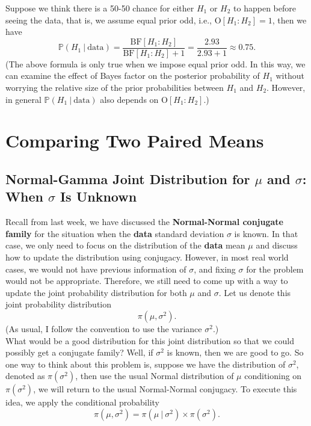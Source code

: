 \documentclass{article}
\begin{document}
Suppose we think there is a 50-50 chance for either $H_1$ or $H_2$ to happen before seeing the data, that is, we assume equal prior odd, i.e., $\text{O}[H_1:H_2] = 1$, then we have
$$ \mathbb{P}(H_1~|~\text{data}) = \frac{\text{BF}[H_1:H_2]}{\text{BF}[H_1:H_2] + 1} = \frac{2.93}{2.93+1}\approx 0.75. $$
(The above formula is only true when we impose equal prior odd. In this way, we can examine the effect of Bayes factor on the posterior probability of $H_1$ without worrying the relative size of the prior probabilities between $H_1$ and $H_2$. However, in general $\mathbb{P}(H_1~|~\text{data})$ also depends on $\text{O}[H_1:H_2]$.)


\section{Comparing Two Paired Means}

\subsection{Normal-Gamma Joint Distribution for $\mu$ and $\sigma$: When $\sigma$ Is Unknown}

Recall from last week, we have discussed the \textbf{Normal-Normal conjugate family} for the situation when the \textbf{data} standard deviation $\sigma$ is known. In that case, we only need to focus on the distribution of the \textbf{data} mean $\mu$ and discuss how to update the distribution using conjugacy. However, in most real world cases, we would not have previous information of $\sigma$, and fixing $\sigma$ for the problem would not be appropriate. Therefore, we still need to come up with a way to update the joint probability distribution for both $\mu$ and $\sigma$. Let us denote this joint probability distribution 
$$ \pi(\mu, \sigma^2). $$
(As usual, I follow the convention to use the variance $\sigma^2$.)\\

What would be a good distribution for this joint distribution so that we could possibly get a conjugate family? Well, if $\sigma^2$ is known, then we are good to go. So one way to think about this problem is, suppose we have the distribution of $\sigma^2$, denoted as $\pi(\sigma^2)$, then use the usual Normal distribution of $\mu$ conditioning on $\pi(\sigma^2)$, we will return to the usual Normal-Normal conjugacy. To execute this idea, we apply the conditional probability
$$ \pi(\mu, \sigma^2) = \pi(\mu~|~\sigma^2)\times \pi(\sigma^2). $$
 
\end{document}
